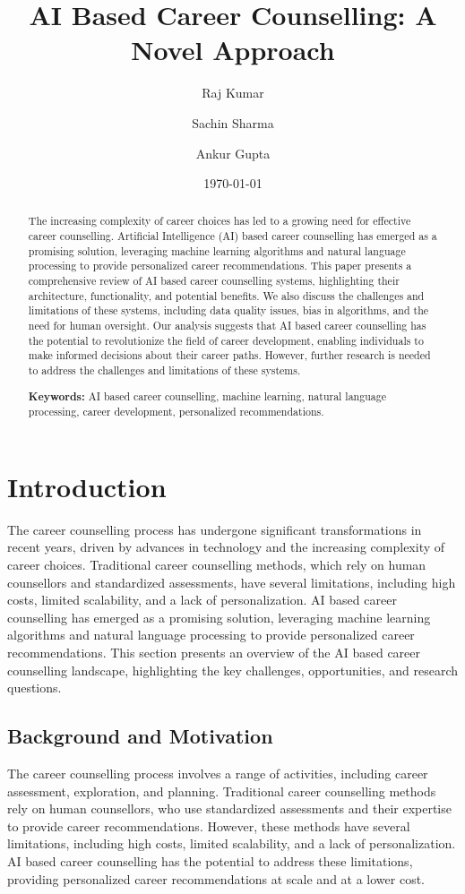 \documentclass[12pt,a4paper]{article}
\title{AI Based Career Counselling: A Novel Approach}
\author{Raj Kumar \and Sachin Sharma \and Ankur Gupta}
\date{\today}
\begin{document}
\maketitle
\thispagestyle{empty}

\begin{abstract}
The increasing complexity of career choices has led to a growing need for effective career counselling. Artificial Intelligence (AI) based career counselling has emerged as a promising solution, leveraging machine learning algorithms and natural language processing to provide personalized career recommendations. This paper presents a comprehensive review of AI based career counselling systems, highlighting their architecture, functionality, and potential benefits. We also discuss the challenges and limitations of these systems, including data quality issues, bias in algorithms, and the need for human oversight. Our analysis suggests that AI based career counselling has the potential to revolutionize the field of career development, enabling individuals to make informed decisions about their career paths. However, further research is needed to address the challenges and limitations of these systems.

\textbf{Keywords:} AI based career counselling, machine learning, natural language processing, career development, personalized recommendations.
\end{abstract}

\newpage
\tableofcontents
\newpage

\twocolumn
\section{Introduction}
The career counselling process has undergone significant transformations in recent years, driven by advances in technology and the increasing complexity of career choices. Traditional career counselling methods, which rely on human counsellors and standardized assessments, have several limitations, including high costs, limited scalability, and a lack of personalization. AI based career counselling has emerged as a promising solution, leveraging machine learning algorithms and natural language processing to provide personalized career recommendations. This section presents an overview of the AI based career counselling landscape, highlighting the key challenges, opportunities, and research questions.

\subsection{Background and Motivation}
The career counselling process involves a range of activities, including career assessment, exploration, and planning. Traditional career counselling methods rely on human counsellors, who use standardized assessments and their expertise to provide career recommendations. However, these methods have several limitations, including high costs, limited scalability, and a lack of personalization. AI based career counselling has the potential to address these limitations, providing personalized career recommendations at scale and at a lower cost.
\end{document}
